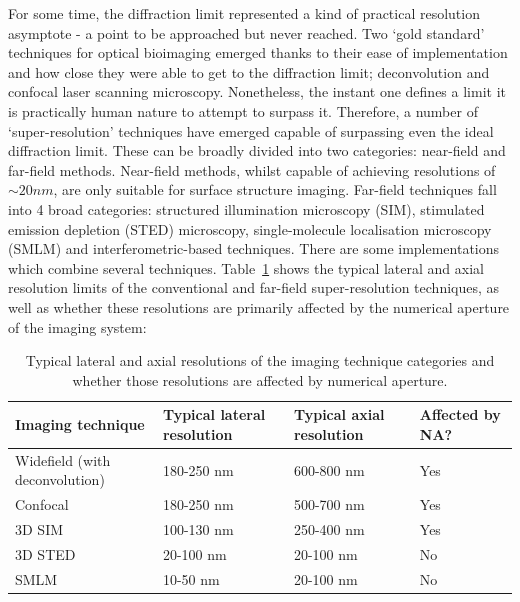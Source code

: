 For some time, the diffraction limit represented a kind of practical 
resolution asymptote - a point to be approached but never reached. Two
`gold standard' techniques for optical bioimaging emerged thanks to their
ease of implementation and how close they were able to get to the diffraction
limit; deconvolution\cite{agard1983three, wallace2001workingperson} and
confocal laser scanning microscopy\cite{sheppard1981theory,minsky1988memoir}. 
Nonetheless, the instant one defines a limit it is practically human nature 
to attempt to surpass it. Therefore, a number of `super-resolution' techniques
have emerged capable of surpassing even the ideal diffraction limit. These
can be broadly divided into two categories: near-field and far-field methods.
Near-field methods, whilst capable of achieving resolutions of $\sim 20 nm$,
are only suitable for surface structure imaging\cite{schermelleh2010guide}. 
Far-field techniques fall into 4 broad categories: structured illumination
microscopy (SIM), stimulated emission depletion (STED) microscopy, 
single-molecule localisation microscopy (SMLM) and interferometric-based 
techniques. There are some implementations which combine several 
techniques. Table~\ref{tab:technique_res} shows the typical lateral and axial resolution limits of the conventional and far-field super-resolution techniques, as well as whether these resolutions are primarily affected by the numerical aperture of the imaging system\cite{schermelleh2010guide,schermelleh2019super,von2017three,blom2014sted,vicidomini2018sted,gustafsson2000surpassing}:

\begin{table}[H]
	\begin{tabular}{ | p{4cm} | p{3cm} | p{2.5cm} | p{2cm} |}
		\hline
		Imaging technique & Typical lateral resolution & Typical axial resolution & Affected by NA?\\ \hline
		Widefield (with deconvolution) & 180-250 nm  & 600-800 nm & Yes \\ \hline
		Confocal & 180-250 nm  & 500-700 nm & Yes \\ \hline
		3D SIM & 100-130 nm  & 250-400 nm & Yes \\ \hline
		3D STED & 20-100 nm  & 20-100 nm & No \\ \hline
		SMLM & 10-50 nm  & 20-100 nm & No \\ \hline
	\end{tabular}
	\caption{\label{tab:technique_res}Typical lateral and axial resolutions of the imaging technique categories and whether those resolutions are affected by numerical aperture.}
\end{table}

